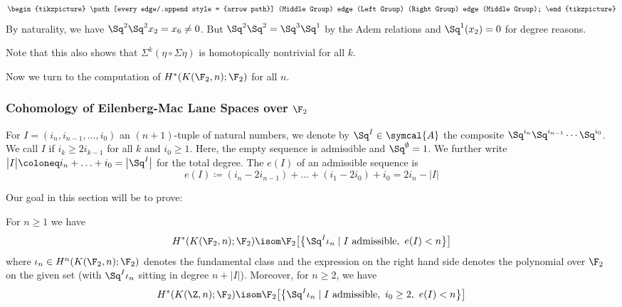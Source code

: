 \begin{example}
\begin{equation*}
\begin{tikzpicture}
			\path[every edge/.append style = {arrow path}]
				(Middle Group) edge (Left Group)
				(Right Group) edge (Middle Group);
		\end{tikzpicture}
	\end{equation*}
	By naturality, we have $\Sq^2 \Sq^2 x_2 = x_6 \neq 0$.
	But $\Sq^2 \Sq^2 = \Sq^3 \Sq^1$ by the Adem relations and $\Sq^1(x_2) = 0$ for degree reasons.

	Note that this also shows that $\Sigma^k(\eta \circ \Sigma \eta)$ is homotopically nontrivial for all $k$.
\end{example}

Now we turn to the computation of $H^*(K(\F_2, n); \F_2)$ for all $n$.
\subsubsection{Cohomology of Eilenberg-Mac Lane Spaces over \texorpdfstring{$\F_2$}{F2}}
\begin{definition}
	For $I = (i_n, i_{n - 1}, \ldots, i_0)$ an $(n + 1)$-tuple of natural numbers, we denote by $\Sq^I \in \symcal{A}$ the composite $\Sq^{i_n} \Sq^{i_{n - 1}} \cdots \Sq^{i_0}$.
	We call $I$  if $i_k \geq 2 i_{k - 1}$ for all $k$ and $i_0 \geq 1$.
	Here, the empty sequence is admissible and $\Sq^{\emptyset} = 1$.
	We further write $\big|I\big| \coloneq i_n + \ldots + i_0 = \big|\Sq^I\big|$ for the total degree.
	The  $e(I)$ of an admissible sequence is 
	\begin{equation*}
		e(I) \coloneq (i_n - 2 i_{n - 1}) + \ldots + (i_1 - 2 i_0) + i_0 = 2 i_n - \big|I\big|
	\end{equation*}
\end{definition}
Our goal in this section will be to prove:
\begin{theorem}\label{thm:cartanserre}
	For $n \geq 1$ we have 
	\begin{equation*}
		H^*(K(\F_2, n); \F_2) \isom \F_2\big[\big\{\Sq^I \iota_n \mid I \text{ admissible},\ e(I) < n\big\}\big]
	\end{equation*}
	where $\iota_n \in H^n(K(\F_2, n); \F_2)$ denotes the fundamental class and the expression on the right hand side denotes the polynomial over $\F_2$ on the given set (with $\Sq^I \iota_n$ sitting in degree $n + \big|I\big|$).
	Moreover, for $n \geq 2$, we have 
	\begin{equation*}
		H^*(K(\Z, n); \F_2) \isom \F_2\big[\big\{\Sq^I \iota_n \mid I \text{ admissible},\ i_0 \geq 2,\ e(I) < n\big\}\big]
	\end{equation*}
\end{theorem}
